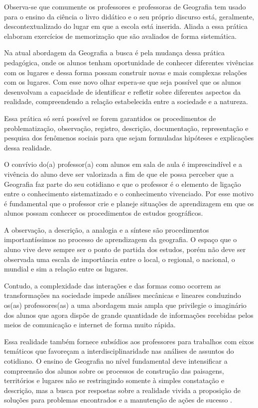 \begin{refsection}
    Observa-se que comumente os professores e professoras de Geografia tem usado para o ensino da ciência o livro didático e o seu próprio discurso está, geralmente, descontextualizado do lugar em que a escola está inserida. Aliada a essa prática elaboram exercícios de memorização que são avaliados de forma sistemática. 

    Na atual abordagem da Geografia a busca é pela mudança dessa prática pedagógica, onde os alunos tenham oportunidade de conhecer diferentes vivências com os lugares e dessa forma possam construir novas e mais complexas relações com os lugares. Com esse novo olhar espera-se que seja possível que os alunos desenvolvam a capacidade de identificar e refletir sobre diferentes aspectos da realidade, compreendendo a relação estabelecida entre a sociedade e a natureza.  

    Essa prática só será possível se forem garantidos os procedimentos de problematização, observação, registro, descrição, documentação, representação e pesquisa dos fenômenos sociais para que sejam formuladas hipóteses e explicações dessa realidade.  

    O convívio do(a) professor(a) com alunos em sala de aula é imprescindível e a vivência do aluno deve ser valorizada a fim de que ele possa perceber que a Geografia faz parte do seu cotidiano e que o professor é o elemento de ligação entre o conhecimento sistematizado e o conhecimento vivenciado. Por esse motivo é fundamental que o professor crie e planeje situações de aprendizagem em que os alunos possam conhecer os procedimentos de estudos geográficos.  

    A observação, a descrição, a analogia e a síntese são procedimentos importantíssimos no processo de aprendizagem da geografia. O espaço que o aluno vive deve sempre ser o ponto de partida dos estudos, porém não deve ser observada uma escala de importância entre o local, o regional, o nacional, o mundial e sim a relação entre os lugares. 

    Contudo, a complexidade das interações e das formas como ocorrem as transformações na sociedade impede análises mecânicas e lineares conduzindo os(as) professores(as) a uma abordagem mais ampla que privilegie o imaginário dos alunos que agora dispõe de grande quantidade de informações recebidas pelos meios de comunicação e internet de forma muito rápida.  

    Essa realidade também fornece subsídios aos professores para trabalhos com eixos temáticos que favoreçam a interdisciplinaridade nas análises de assuntos do cotidiano. O ensino de Geografia no nível fundamental deve intensificar a compreensão dos alunos sobre os processos de construção das paisagens, territórios e lugares não se restringindo somente à simples constatação e descrição, mas a busca por respostas sobre a realidade vivida a proposição de soluções para problemas encontrados e a manutenção de ações de sucesso \cite{ParâmetrosCurricularesGeografia2001}. 


\end{refsection}
